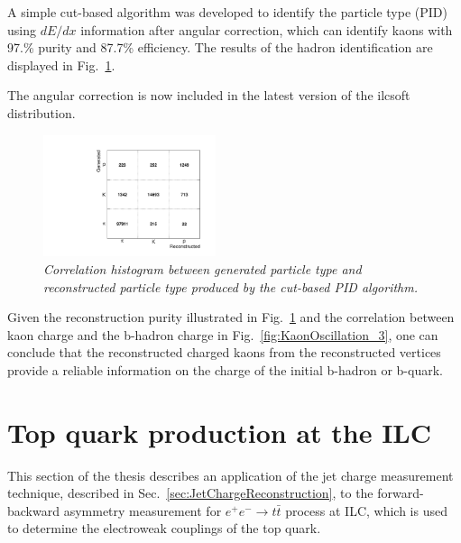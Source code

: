 A simple cut-based algorithm was developed to identify the particle type (PID) using $dE/dx$ information after angular correction, which can identify kaons with 97.\% purity and 87.7\% efficiency.
The results of the hadron identification are displayed in Fig.~\ref{fig:dEdxResults_3}.

The angular correction is now included in the latest version of the {\sc ilcsoft} distribution.

\begin{figure}[h]
{\centering
    \includegraphics[width=0.45\textwidth]{ILD/plots/dedx-results.pdf}
    \caption{\sl Correlation histogram between generated particle type and reconstructed particle type produced by the cut-based PID algorithm.
    }
    \label{fig:dEdxResults_3}
  }
 
\end{figure}


Given the reconstruction purity illustrated in Fig.~\ref{fig:dEdxResults_3} and the correlation between kaon charge and the b-hadron charge in Fig.~\ref{fig:KaonOscillation_3}, one can conclude that the reconstructed charged kaons from the reconstructed vertices provide a reliable information on the charge of the initial b-hadron or b-quark. 




\section{Top quark production at the ILC}
This section of the thesis describes an application of the jet charge measurement technique, described in Sec.~\ref{sec:JetChargeReconstruction}, to the forward-backward asymmetry measurement for $e^+e^- \to t\bar{t}$ process at ILC, which is used to determine the electroweak couplings of the top quark.



